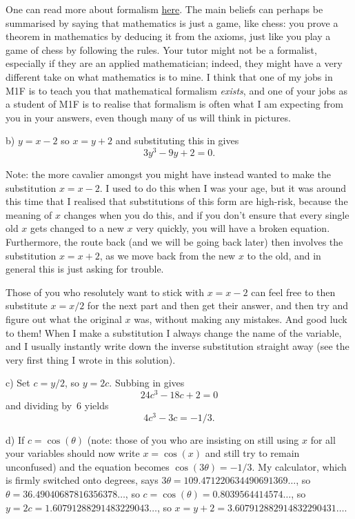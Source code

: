 \documentclass[10pt]{article}
\begin{document}
One can read more about formalism \href{https://en.wikipedia.org/wiki/Formalism_(philosophy_of_mathematics)}{here}. The main beliefs can perhaps be summarised by saying that mathematics is just a game, like chess: you prove a theorem in mathematics by deducing it from the axioms, just like you play a game of chess by following the rules. Your tutor might not be a formalist, especially if they are an applied mathematician; indeed, they might have a very different take on what mathematics is to mine. I think that one of my jobs in M1F is to teach you that mathematical formalism \emph{exists}, and one of your jobs as a student of M1F is to realise that formalism is often what I am expecting from you in your answers, even though many of us will think in pictures.

\medskip
{} 

b) $y=x-2$ so $x=y+2$ and substituting this in gives
$$3y^3 - 9y + 2=0.$$

Note: the more cavalier amongst you might have instead wanted to make
the substitution $x=x-2$. I used to do this when I was your age, but it
was around this time that I realised that substitutions of this form are
high-risk, because the meaning of $x$ changes when you do this, and if you
don't ensure that every single old $x$ gets changed to a new $x$ very
quickly, you will have a broken equation. Furthermore, the route back
(and we will be going back later) then involves the substitution $x=x+2$,
as we move back from the new $x$ to the old, and in general this is
just asking for trouble.

Those of you who resolutely want to stick with $x=x-2$ can feel free
to then substitute $x=x/2$ for the next part and then get their answer,
and then try and figure out what the original $x$ was, without making
any mistakes. And good luck to them! When I make a substitution I always
change the name of the variable, and I usually instantly write down the
inverse substitution straight away (see the very first thing I wrote
in this solution).

c) Set $c=y/2$, so $y=2c$. Subbing in gives
$$24c^3 - 18c + 2=0$$
and dividing by~6 yields
$$4c^3-3c=-1/3.$$

d) If $c=\cos(\theta)$ (note: those of you who are insisting on still using $x$ for all your variables should now write $x=\cos(x)$ and still try to remain unconfused) and the equation becomes $\cos(3\theta)=-1/3$. My calculator, which is firmly switched onto degrees, says $3\theta=109.471220634490691369\ldots$, so $\theta=36.49040687816356378\ldots$, so $c=\cos(\theta)=0.8039564414574\ldots$, so $y=2c=1.60791288291483229043\ldots$, so $x=y+2=3.607912882914832290431\ldots$.
\end{document}
